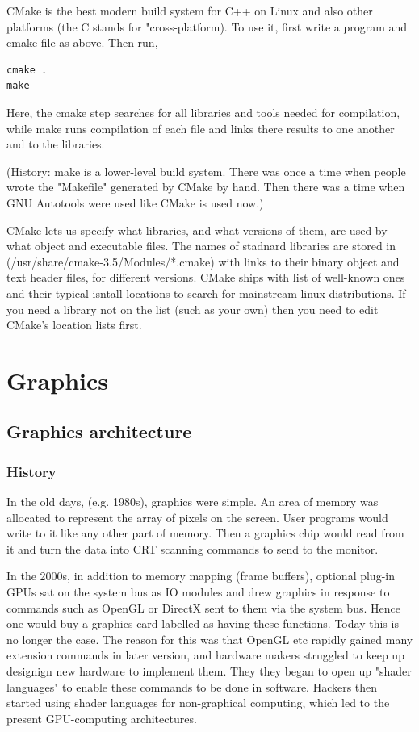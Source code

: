 \documentclass[oneside,english]{scrbook}
\begin{document}



CMake is the best modern build system for C++ on Linux and also other platforms (the C stands for "cross-platform).  To use it, first write a program and cmake file as above. Then run,
\begin{lstlisting}
cmake .
make
\end{lstlisting}

Here, the cmake step searches for all libraries and tools needed for compilation, while make runs compilation of each file and links there results to one another and to the libraries.

(History: make is a lower-level build system. There was once a time when people wrote the "Makefile" generated by CMake by hand.  Then there was a time when GNU Autotools were used like CMake is used now.)

CMake lets us specify what libraries, and what versions of them,  are used by what object and executable files.  The names of stadnard libraries are stored in (/usr/share/cmake-3.5/Modules/*.cmake) with links to their binary object and text header files, for different versions.  CMake ships with list of well-known ones and their typical isntall locations to search for mainstream linux distributions. If you need a library not on the list (such as your own) then you need to edit CMake's location lists first.

\part{Graphics}


\chapter{Graphics architecture}

\section{History}

In the old days, (e.g. 1980s), graphics were simple.  An area of memory was allocated to represent the array of pixels on the screen. User programs would write to it like any other part of memory. Then a graphics chip would read from it and turn the data into CRT scanning commands to send to the monitor.

In the 2000s, in addition to memory mapping (frame buffers), optional plug-in GPUs sat on the system bus as IO modules and drew graphics in response to commands such as OpenGL or DirectX sent to them via the system bus. Hence one would buy a graphics card labelled as having these functions.   Today this is no longer the case.  The reason for this was that OpenGL etc rapidly gained many extension commands in later version, and hardware makers struggled to keep up designign new hardware to implement them. They they began to open up "shader languages" to enable these commands to be done in software.  Hackers then started using shader languages for non-graphical computing, which led to the present GPU-computing architectures.
\end{document}
